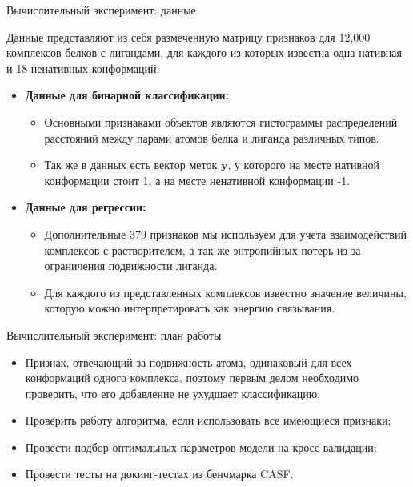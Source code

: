 \documentclass[hyperref={unicode}]{beamer}
\begin{document}
\begin{frame}{Вычислительный эксперимент: данные}
\begin{footnotesize}
Данные представляют из себя размеченную матрицу признаков для 12,000 комплексов белков с лигандами, для каждого из которых известна одна нативная и 18 ненативных конформаций. 
\begin{itemize}
    \item \textbf{Данные для бинарной классификации:} 
    \begin{itemize}
    \item Основными признаками объектов являются гистограммы распределений расстояний между парами атомов белка и лиганда различных типов.
    \item Так же в данных есть вектор меток $\mathbf{y}$, у которого на месте нативной конформации стоит 1, а на месте ненативной конформации -1.
    \end{itemize}
    \item \textbf{Данные для регрессии:}
    \begin{itemize}
    \item Дополнительные 379 признаков мы используем для учета взаимодействий комплексов с растворителем, а так же энтропийных потерь из-за ограничения подвижности лиганда.
    \item Для каждого из представленных комплексов известно значение величины, которую можно интерпретировать как энергию связывания.
    \end{itemize}
\end{itemize}
\end{footnotesize}
\end{frame}
\begin{frame}{Вычислительный эксперимент: план работы}
\begin{itemize}
    \item Признак, отвечающий за подвижность атома, одинаковый для всех конформаций одного комплекса, поэтому первым делом необходимо проверить, что его добавление не ухудшает классификацию;
    \item Проверить работу алгоритма, если использовать все имеющиеся признаки;
    \item Провести подбор оптимальных параметров модели на кросс-валидации;
    \item Провести тесты на докинг-тестах из бенчмарка CASF.
\end{itemize}
\end{frame}
\end{document}
